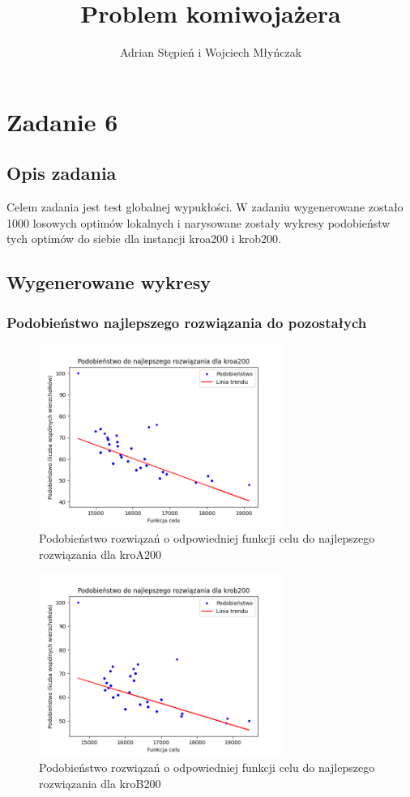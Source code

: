 \documentclass[a4paper]{article}
\title{Problem komiwojażera}
\author{Adrian Stępień i Wojciech Młyńczak}
\begin{document}
\maketitle

\section{Zadanie 6}

\subsection{Opis zadania}

Celem zadania jest test globalnej wypukłości. W zadaniu wygenerowane zostało 1000 losowych optimów lokalnych i narysowane zostały wykresy podobieństw tych optimów do siebie dla instancji kroa200 i krob200.


\subsection{Wygenerowane wykresy}

\subsubsection{Podobieństwo najlepszego rozwiązania do pozostałych}

\begin{figure}[H]
\centering
\includegraphics[width=300px]{lab6/bpa.png}
\caption{Podobieństwo rozwiązań o odpowiedniej funkcji celu do najlepszego rozwiązania dla kroA200}
\end{figure}

\begin{figure}[H]
\centering
\includegraphics[width=300px]{lab6/bpb.png}
\caption{Podobieństwo rozwiązań o odpowiedniej funkcji celu do najlepszego rozwiązania dla kroB200}
\end{figure}
\end{document}
